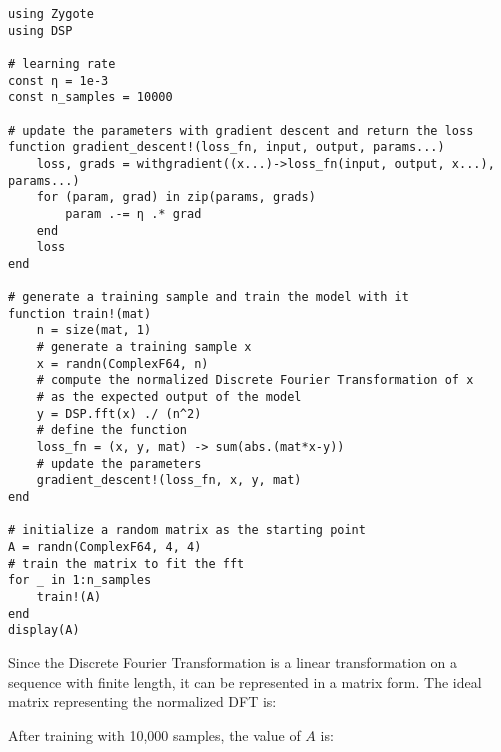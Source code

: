 \documentclass[a4paper,10.5pt]{article}
\begin{document}
\begin{verbatim}
using Zygote
using DSP

# learning rate
const η = 1e-3
const n_samples = 10000

# update the parameters with gradient descent and return the loss
function gradient_descent!(loss_fn, input, output, params...)
    loss, grads = withgradient((x...)->loss_fn(input, output, x...), params...)
    for (param, grad) in zip(params, grads)
        param .-= η .* grad
    end
    loss
end

# generate a training sample and train the model with it
function train!(mat)
    n = size(mat, 1)
    # generate a training sample x
    x = randn(ComplexF64, n)
    # compute the normalized Discrete Fourier Transformation of x
    # as the expected output of the model
    y = DSP.fft(x) ./ (n^2)
    # define the function 
    loss_fn = (x, y, mat) -> sum(abs.(mat*x-y))
    # update the parameters
    gradient_descent!(loss_fn, x, y, mat)
end

# initialize a random matrix as the starting point
A = randn(ComplexF64, 4, 4)
# train the matrix to fit the fft
for _ in 1:n_samples
    train!(A)
end
display(A)
\end{verbatim}

Since the Discrete Fourier Transformation is a linear transformation on a sequence with finite length, it can be represented in a matrix form. The ideal matrix representing the normalized DFT is:

\begin{table}[h]
\centering
\renewcommand{\arraystretch}{1.2} %
\caption{Ideal Matrix Representation}
\end{table}

After training with 10,000 samples, the value of $A$ is:
\end{document}
